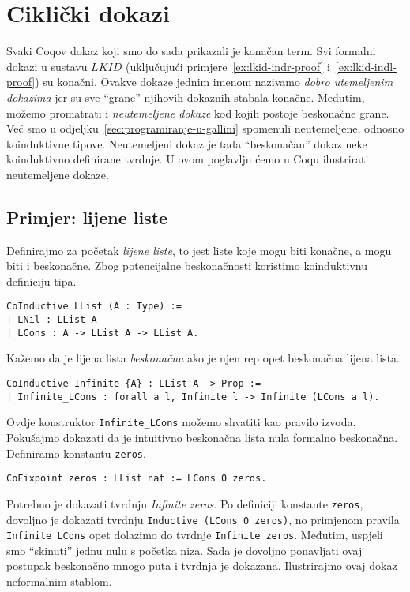 \chapter{Ciklički dokazi}\label{cha:cikliki-dokazi}
Svaki Coqov dokaz koji smo do sada prikazali je konačan term.
Svi formalni dokazi u sustavu \(\mathit{LKID}\) (uključujući primjere~\ref{ex:lkid-indr-proof} i~\ref{ex:lkid-indl-proof}) su konačni.
Ovakve dokaze jednim imenom nazivamo \textit{dobro utemeljenim dokazima} jer su sve \enquote{grane} njihovih dokaznih stabala konačne.
Međutim, možemo promatrati i \textit{neutemeljene dokaze} kod kojih postoje beskonačne grane.
Već smo u odjeljku~\ref{sec:programiranje-u-gallini} spomenuli neutemeljene, odnosno koinduktivne tipove.
Neutemeljeni dokaz je tada \enquote{beskonačan} dokaz neke koinduktivno definirane tvrdnje.
U ovom poglavlju ćemo u Coqu ilustrirati neutemeljene dokaze.

\section{Primjer: lijene liste}
Definirajmo za početak \textit{lijene liste}, to jest liste koje mogu biti konačne, a mogu biti i beskonačne.
Zbog potencijalne beskonačnosti koristimo koinduktivnu definiciju tipa.
\begin{verbatim}
CoInductive LList (A : Type) :=
| LNil : LList A
| LCons : A -> LList A -> LList A.
\end{verbatim}
\noindent Kažemo da je lijena lista \textit{beskonačna} ako je njen rep opet beskonačna lijena lista.
\begin{verbatim}
CoInductive Infinite {A} : LList A -> Prop :=
| Infinite_LCons : forall a l, Infinite l -> Infinite (LCons a l).
\end{verbatim}
\noindent Ovdje konstruktor \texttt{Infinite\_LCons} možemo shvatiti kao pravilo izvoda.
Pokušajmo dokazati da je intuitivno beskonačna lista nula formalno beskonačna.
Definiramo konstantu \texttt{zeros}.
\begin{verbatim}
CoFixpoint zeros : LList nat := LCons 0 zeros.
\end{verbatim}
\noindent Potrebno je dokazati tvrdnju \textit{Infinite zeros}.
Po definiciji konstante \texttt{zeros}, dovoljno je dokazati
tvrdnju \texttt{Inductive (LCons 0 zeros)}, no primjenom pravila \texttt{Infinite\_LCons}
opet dolazimo do tvrdnje \texttt{Infinite zeros}.
Međutim, uspjeli smo \enquote{skinuti} jednu nulu s početka niza.
Sada je dovoljno ponavljati ovaj postupak beskonačno mnogo puta i tvrdnja je dokazana.
Ilustrirajmo ovaj dokaz neformalnim stablom.
\begin{prooftree}
\end{prooftree}



